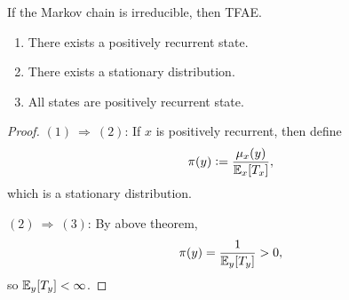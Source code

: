 \begin{thm}
    If the Markov chain is irreducible, then TFAE.
    \begin{enumerate}[label=(\arabic{*})]
        \item There exists a positively recurrent state.
        \item There exists a stationary distribution.
        \item All states are positively recurrent state.
    \end{enumerate}
\end{thm}
\begin{proof}
    \noindent $(1) ~\Rightarrow ~(2)$: If $x$ is positively recurrent, then define
    \begin{equation*}
        \pi(y) \vcentcolon= \frac{\mu_x(y)}{\mathbb{E}_x[T_x]},
    \end{equation*}
    which is a stationary distribution.

    \noindent $(2) ~\Rightarrow ~(3)$: By above theorem,
    \begin{equation*}
        \pi(y) = \frac{1}{\mathbb{E}_y[T_y]} > 0,
    \end{equation*}
    so $\mathbb{E}_y[T_y] < \infty$.
\end{proof}